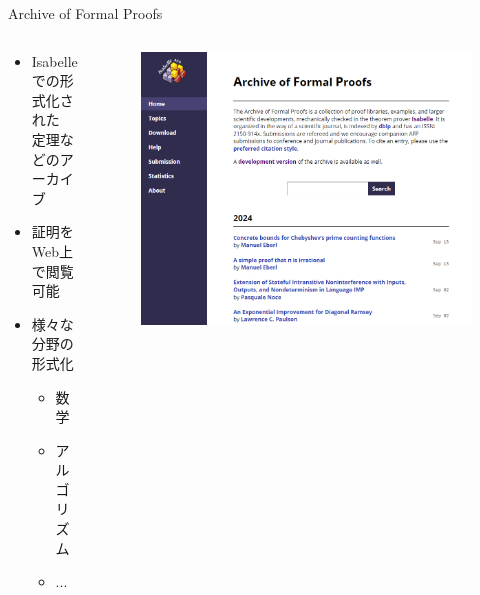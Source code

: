 \documentclass[17pt,aspectratio=169]{beamer}
\begin{document}
\begin{frame}{Archive of Formal Proofs}
    \vspace{3pt}
    \begin{columns}
        \begin{column}{0.75\textwidth} 
            
            {\small \begin{itemize}[itemsep=5pt]
                \item Isabelleでの形式化された\\
                      定理などのアーカイブ
                \item 証明をWeb上で閲覧可能
                \item 様々な分野の形式化
                \begin{itemize}[itemsep=3pt]
                    \item 数学 
                    \item アルゴリズム
                    \item ...
                \end{itemize}
            \end{itemize}}
        \end{column}
        \begin{column}{0.25\textwidth}
            \begin{figure}
                \hspace{-2cm}
                \includegraphics[width=1.3\linewidth]{./images/isabelle_archive.png }
            \end{figure}
        \end{column}
    \end{columns}
\end{frame}
\end{document}

